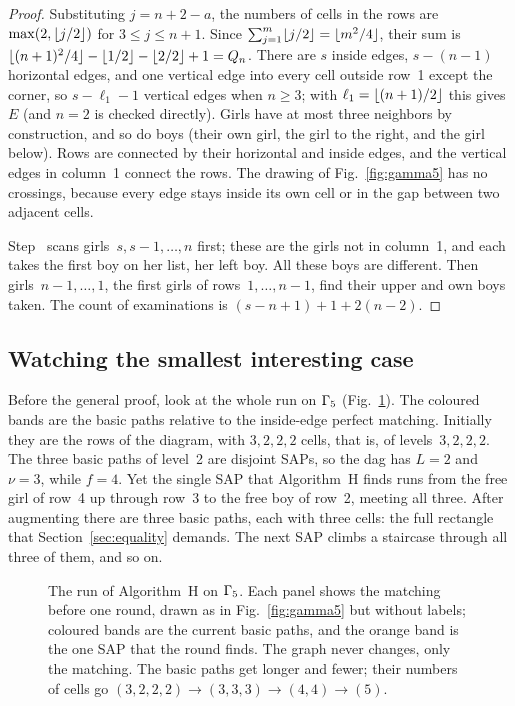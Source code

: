 \begin{proof}
Substituting $j=n+2-a$, the numbers of cells in the rows are $\max(2,\lfloor j/2\rfloor)$ for
$3\le j\le n+1$. Since $\sum_{j=1}^{m}\lfloor j/2\rfloor=\lfloor m^2/4\rfloor$, their sum is
$\lfloor(n+1)^2/4\rfloor-\lfloor1/2\rfloor-\lfloor2/2\rfloor+1=Q_n$. There are $s$ inside
edges, $s-(n-1)$ horizontal edges, and one vertical edge into every cell
outside row~1 except the corner, so $s-\ell_1-1$ vertical edges when
$n\ge3$; with $\ell_1=\lfloor(n+1)/2\rfloor$ this gives $E$ (and $n=2$ is
checked directly). Girls have at most three neighbors by construction,
and so do boys (their own girl, the girl to the right, and the girl
below). Rows are connected by their horizontal and inside edges, and the
vertical edges in column~1 connect the rows. The drawing of
Fig.~\ref{fig:gamma5} has no crossings, because every edge stays inside
its own cell or in the gap between two adjacent cells.

Step~ scans girls~$s,s-1,\ldots,n$ first; these are the girls not in
column~1, and each takes the first boy on her list, her left boy. All
these boys are different. Then girls~$n-1,\ldots,1$, the first girls of
rows~$1,\ldots,n-1$, find their upper and own boys taken. The count of
examinations is $(s-n+1)+1+2(n-2)$.
\end{proof}

\subsection{Watching the smallest interesting case}
\label{sec:watch}

Before the general proof, look at the whole run on $\Gamma_5$
(Fig.~\ref{fig:gamma5rounds}). The coloured bands are the basic paths
relative to the inside-edge perfect matching. Initially they are the rows
of the diagram, with $3,2,2,2$ cells, that is, of levels~$3,2,2,2$. The
three basic paths of level~2 are disjoint SAPs, so the dag has $L=2$ and
$\nu=3$, while $f=4$. Yet the single SAP that Algorithm~H finds runs from
the free girl of row~4 up through row~3 to the free boy of row~2, meeting
all three. After augmenting there are three basic paths, each with three
cells: the full rectangle that Section~\ref{sec:equality} demands. The
next SAP climbs a staircase through all three of them, and so on.

\begin{figure}[ht]
\centering
\resizebox{\linewidth}{!}{}
\caption{The run of Algorithm~H on $\Gamma_5$. Each panel shows the
matching before one round, drawn as in Fig.~\ref{fig:gamma5} but without
labels; coloured bands are the current basic paths, and the orange band is
the one SAP that the round finds. The graph never changes, only the
matching. The basic paths get longer and fewer; their numbers of cells go
$(3,2,2,2)\to(3,3,3)\to(4,4)\to(5)$.}
\label{fig:gamma5rounds}
\end{figure}

